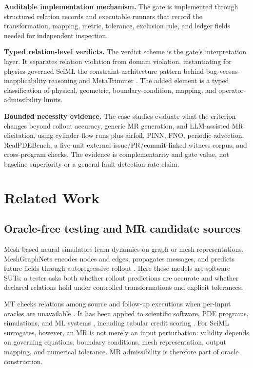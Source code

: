 \documentclass[preprint,12pt,authoryear]{elsarticle}
\begin{document}
\textbf{Auditable implementation mechanism.} The gate is implemented through structured relation records and executable runners that record the transformation, mapping, metric, tolerance, exclusion rule, and ledger fields needed for independent inspection.

\textbf{Typed relation-level verdicts.} The verdict scheme is the gate's interpretation layer. It separates relation violation from domain violation, instantiating for physics-governed SciML the constraint-architecture pattern behind bug-versus-inapplicability reasoning \citep{duqueTorres2023bugornot,duqueTorres2023completePipeline} and MetaTrimmer \citep{duqueTorres2023metaTrimmer}. The added element is a typed classification of physical, geometric, boundary-condition, mapping, and operator-admissibility limits.

\textbf{Bounded necessity evidence.} The case studies evaluate what the criterion changes beyond rollout accuracy, generic MR generation, and LLM-assisted MR elicitation, using cylinder-flow runs plus airfoil, PINN, FNO, periodic-advection, RealPDEBench, a five-unit external issue/PR/commit-linked witness corpus, and cross-program checks. The evidence is complementarity and gate value, not baseline superiority or a general fault-detection-rate claim.

\section{Related Work}
\label{sec:related}

\subsection{Oracle-free testing and MR candidate sources}
\label{subsec:mesh-simulation}
\label{subsec:mt-oracle}
\label{subsec:mr-identification}

Mesh-based neural simulators learn dynamics on graph or mesh representations. MeshGraphNets encodes nodes and edges, propagates messages, and predicts future fields through autoregressive rollout \citep{pfaff2021meshgraphnets}. Here these models are software SUTs: a tester asks both whether rollout predictions are accurate and whether declared relations hold under controlled transformations and explicit tolerances.

MT checks relations among source and follow-up executions when per-input oracles are unavailable \citep{chen1998metamorphic,segura2016survey,chen2018mtSurvey}. It has been applied to scientific software, PDE programs, simulations, and ML systems \citep{chen2002pde,chen2011ml,kanewala2019scientific,olsen2019simulation}, including tabular credit scoring \citep{ying2025}. For SciML surrogates, however, an MR is not merely an input perturbation: validity depends on governing equations, boundary conditions, mesh representation, output mapping, and numerical tolerance. MR admissibility is therefore part of oracle construction.
\end{document}
